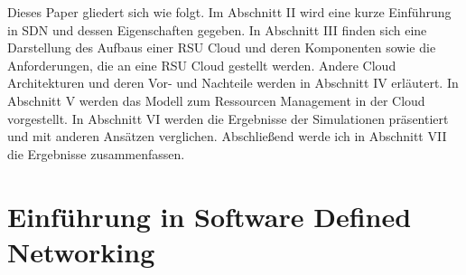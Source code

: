 \documentclass[conference]{IEEEtran}
\begin{document}
Dieses Paper gliedert sich wie folgt. Im Abschnitt II wird eine kurze Einführung in SDN und dessen Eigenschaften gegeben. In Abschnitt III finden sich eine Darstellung des Aufbaus einer RSU Cloud und deren Komponenten sowie die Anforderungen, die an eine RSU Cloud gestellt werden. Andere Cloud Architekturen und deren Vor- und Nachteile werden in Abschnitt IV erläutert. In Abschnitt V werden das Modell zum Ressourcen Management in der Cloud vorgestellt. In Abschnitt VI werden die Ergebnisse der Simulationen präsentiert und mit anderen Ansätzen verglichen. Abschließend werde ich in Abschnitt VII die Ergebnisse zusammenfassen.



\section{Einführung in Software Defined Networking}
\end{document}

